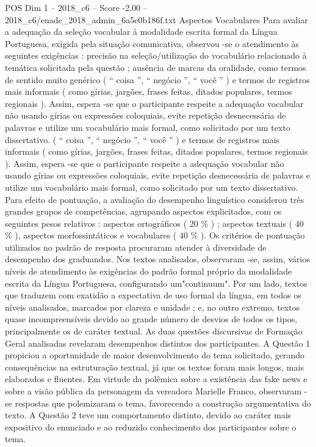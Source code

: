 \begin{textsample}{POS Dim 1 – 2018\_c6 – Score -2.00 – 2018\_c6/enade\_2018\_admin\_6a5e0b186f.txt}
Aspectos Vocabulares Para avaliar a adequação da seleção vocabular à modalidade escrita formal da Língua Portuguesa, exigida pela situação comunicativa, observou -se o atendimento às seguintes exigências : precisão na seleção/utilização do vocabulário relacionado à temática solicitada pela questão ; ausência de marcas da oralidade, como termos de sentido muito genérico ( “ coisa ”, “ negócio ”, “ você ” ) e termos de registros mais informais ( como gírias, jargões, frases feitas, ditados populares, termos regionais ).
Assim, espera -se que o participante respeite a adequação vocabular não usando gírias ou expressões coloquiais, evite repetição desnecessária de palavras e utilize um vocabulário mais formal, como solicitado por um texto dissertativo. ( “ coisa ”, “ negócio ”, “ você ” ) e termos de registros mais informais ( como gírias, jargões, frases feitas, ditados populares, termos regionais ).
Assim, espera -se que o participante respeite a adequação vocabular não usando gírias ou expressões coloquiais, evite repetição desnecessária de palavras e utilize um vocabulário mais formal, como solicitado por um texto dissertativo.
Para efeito de pontuação, a avaliação do desempenho linguístico considerou três grandes grupos de competências, agrupando aspectos explicitados, com os seguintes pesos relativos : aspectos ortográficos ( 20 \% ) ; aspectos textuais ( 40 \% ), aspectos morfossintáticos e vocabulares ( 40 \% ).
Os critérios de pontuação utilizados no padrão de resposta procuraram atender à diversidade de desempenho dos graduandos.
Nos textos analisados, observaram -se, assim, vários níveis de atendimento às exigências do padrão formal próprio da modalidade escrita da Língua Portuguesa, configurando um"continuum".
Por um lado, textos que traduzem com exatidão a expectativa de uso formal da língua, em todos os níveis analisados, marcados por clareza e unidade ; e, no outro extremo, textos quase incompreensíveis devido ao grande número de desvios de todos os tipos, principalmente os de caráter textual.
As duas questões discursivas de Formação Geral analisadas revelaram desempenhos distintos dos participantes.
A Questão 1 propiciou a oportunidade de maior desenvolvimento do tema solicitado, gerando consequências na estruturação textual, já que os textos foram mais longos, mais elaborados e fluentes.
Em virtude da polêmica sobre a existência das fake news e sobre a visão pública da personagem da vereadora Marielle Franco, observaram -se respostas que polemizaram o tema, favorecendo a construção argumentativa do texto.
A Questão 2 teve um comportamento distinto, devido ao caráter mais expositivo do enunciado e ao reduzido conhecimento dos participantes sobre o tema.

\end{textsample}
